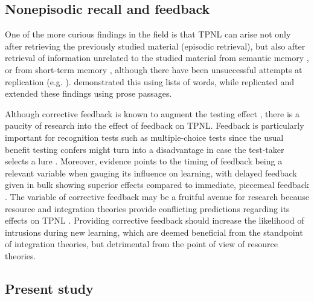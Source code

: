 \documentclass[../main.tex]{subfiles}
\begin{document}
\hypertarget{nonepisodic}{%
\subsection{Nonepisodic recall and feedback}}

One of the more curious findings in the field is that TPNL can arise not 
only after retrieving the previously studied material (episodic retrieval), 
but also after retrieval of information unrelated to the studied material 
from semantic memory \citep{divisRetrievalSpeedsContext2014, 
pastotterRetrievalLearningFacilitates2011}, or from short-term memory 
\citep{pastotterRetrievalLearningFacilitates2011}, although there have been 
unsuccessful attempts at replication (e.g. 
\citealp{weinsteinNotAllRetrieval2015}). 
\cite{pastotterRetrievalLearningFacilitates2011} demonstrated this using 
lists of words, while \cite{divisRetrievalSpeedsContext2014} replicated and 
extended these findings using prose passages.

Although corrective feedback is known to augment the testing effect 
\citep{roedigeriiiCriticalRoleRetrieval2011}, there is a paucity of research 
into the effect of feedback on TPNL. Feedback is particularly important for 
recognition tests such as multiple-choice tests since the usual benefit 
testing confers might turn into a disadvantage in case the test-taker 
selects a lure \citep{roedigerPositiveNegativeConsequences2005, 
marshMemorialConsequencesMultiplechoice2007}. Moreover, evidence points to 
the timing of feedback being a relevant variable when gauging its influence 
on learning, with delayed feedback given in bulk showing superior effects 
compared to immediate, piecemeal feedback 
\citep{metcalfeDelayedImmediateFeedback2009,butlerEffectTypeTiming2007, 
butlerFeedbackEnhancesPositive2008,smithLearningFeedbackSpacing2010}.
The variable of corrective feedback may be a fruitful avenue for research 
because resource and integration theories provide conflicting predictions 
regarding its effects on TPNL \citep{chanRetrievalPotentiatesNew2018}. 
Providing corrective feedback should increase the likelihood of intrusions 
during new learning, which are deemed beneficial from the standpoint of 
integration theories, but detrimental from the point of view of resource 
theories.


\subsection{Present study\label{present}}
\end{document}
